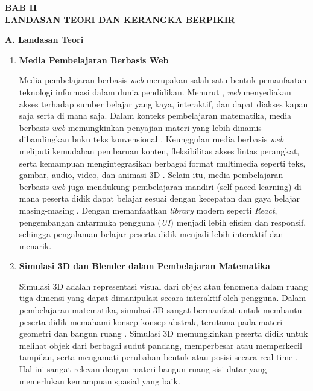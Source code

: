 \newpage
\begin{center}
    \textbf{BAB II}\\
    \textbf{LANDASAN TEORI DAN KERANGKA BERPIKIR}
\end{center}

\textbf{A. Landasan Teori}

\begin{enumerate}
    \item \textbf{Media Pembelajaran Berbasis Web}
    
    \hspace*{1cm}Media pembelajaran berbasis \textit{web} merupakan salah satu bentuk pemanfaatan teknologi informasi dalam dunia pendidikan. Menurut \cite{rosen2009}, \textit{web} menyediakan akses terhadap sumber belajar yang kaya, interaktif, dan dapat diakses kapan saja serta di mana saja. Dalam konteks pembelajaran matematika, media berbasis \textit{web} memungkinkan penyajian materi yang lebih dinamis dibandingkan buku teks konvensional \citep{rousseau2015}. Keunggulan media berbasis \textit{web} meliputi kemudahan pembaruan konten, fleksibilitas akses lintas perangkat, serta kemampuan mengintegrasikan berbagai format multimedia seperti teks, gambar, audio, video, dan animasi 3D \citep{clark2011}. Selain itu, media pembelajaran berbasis \textit{web} juga mendukung pembelajaran mandiri (self-paced learning) di mana peserta didik dapat belajar sesuai dengan kecepatan dan gaya belajar masing-masing \citep{bonk2009}. Dengan memanfaatkan \textit{library} modern seperti \textit{React}, pengembangan antarmuka pengguna (\textit{UI}) menjadi lebih efisien dan responsif, sehingga pengalaman belajar peserta didik menjadi lebih interaktif dan menarik.

    \item \textbf{Simulasi 3D dan Blender dalam Pembelajaran Matematika}
    
    \hspace*{1cm}Simulasi 3D adalah representasi visual dari objek atau fenomena dalam ruang tiga dimensi yang dapat dimanipulasi secara interaktif oleh pengguna. Dalam pembelajaran matematika, simulasi 3D sangat bermanfaat untuk membantu peserta didik memahami konsep-konsep abstrak, terutama pada materi geometri dan bangun ruang \citep{kaufmann2005}. Simulasi 3D memungkinkan peserta didik untuk melihat objek dari berbagai sudut pandang, memperbesar atau memperkecil tampilan, serta mengamati perubahan bentuk atau posisi secara real-time \citep{lee2010}. Hal ini sangat relevan dengan materi bangun ruang sisi datar yang memerlukan kemampuan spasial yang baik.
    

\end{enumerate}
